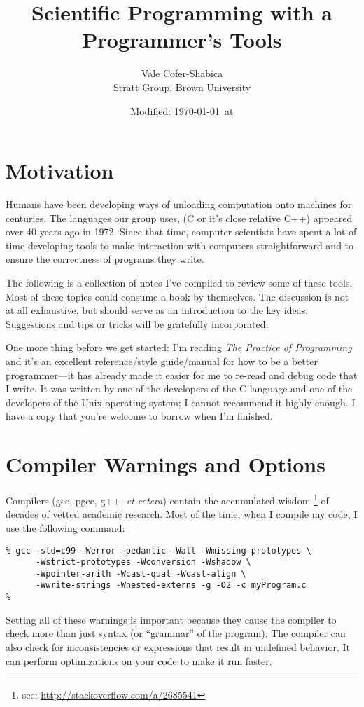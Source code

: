 \documentclass[letterpaper,12pt]{article}
\title{Scientific Programming with a Programmer's Tools}
\author{Vale Cofer-Shabica\\ Stratt Group, Brown University}
\date{Modified: \today\ at \currenttime}
\begin{document}
\maketitle

\section*{Motivation}
Humans have been developing ways of unloading computation onto machines for centuries. The languages our group uses, (C or it's close relative C++) appeared over 40 years ago in 1972. Since that time, computer scientists have spent a lot of time developing tools to make interaction with computers straightforward and to ensure the correctness of programs they write.

The following is a collection of notes I've compiled to review some of these tools. Most of these topics could consume a book by themselves. The discussion is not at all exhaustive, but should serve as an introduction to the key ideas. Suggestions and tips or tricks will be gratefully incorporated.

One more thing before we get started: I'm reading \emph{The Practice of Programming}\cite{practiceofprogramming} and it's an excellent reference/style guide/manual for how to be a better programmer---it has already made it easier for me to re-read and debug code that I write. It was written by one of the developers of the C language and one of the developers of the Unix operating system; I cannot recommend it highly enough. I have a copy that you're welcome to borrow when I'm finished.

\section{Compiler Warnings and Options} \label{sec:cflags}
Compilers (gcc, pgcc, g++, \emph{et cetera}) contain the accumulated wisdom \footnote{see: \url{http://stackoverflow.com/a/2685541}} of decades of vetted academic research. Most of the time, when I compile my code, I use the following command:

\begin{verbatim}
% gcc -std=c99 -Werror -pedantic -Wall -Wmissing-prototypes \
      -Wstrict-prototypes -Wconversion -Wshadow \
      -Wpointer-arith -Wcast-qual -Wcast-align \
      -Wwrite-strings -Wnested-externs -g -O2 -c myProgram.c
%
\end{verbatim}

Setting all of these warnings is important because they cause the compiler to check more than just syntax (or ``grammar'' of the program). The compiler can also check for inconsistencies or expressions that result in undefined behavior. It can perform optimizations on your code to make it run faster.
\end{document}

